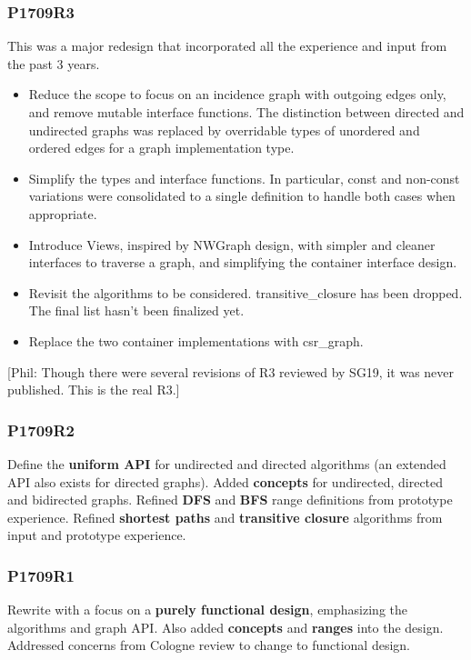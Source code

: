 \documentclass[10pt,onecolumn]{article}
\newcommand{\comment}[2]{{\color{comment}[{\sc #1:} \textsf{#2}]}}
\newcommand{\phil}[1]{\comment{Phil}{#1}}
\begin{document}
\subsubsection*{P1709R3}
This was a major redesign that incorporated all the experience and input from the past 3 years.
\begin{itemize}
\item Reduce the scope to focus on an incidence graph with outgoing edges only, and remove mutable interface functions. The distinction between directed and undirected graphs was replaced by overridable types of unordered and ordered edges for a graph implementation type.
\item Simplify the types and interface functions. In particular, const and non-const variations were consolidated to a single definition to handle both cases 
when appropriate.
\item Introduce Views, inspired by NWGraph design, with simpler and cleaner interfaces to traverse a graph, and simplifying the container interface design.
\item Revisit the algorithms to be considered. transitive\_closure has been dropped. The final list hasn't been finalized yet.
\item Replace the two container implementations with csr\_graph.
\end{itemize}

\phil{Though there were several revisions of R3 reviewed by SG19, it was never published. This is the real R3.}

\subsubsection*{P1709R2}
Define the \textbf{uniform API} for undirected and directed algorithms (an extended API also exists for directed graphs). Added \textbf{concepts} for undirected, directed and bidirected graphs. Refined \textbf{DFS} and \textbf{BFS} range definitions from prototype experience. Refined \textbf{shortest paths} and \textbf{transitive closure} algorithms from input and prototype experience.

\subsubsection*{P1709R1}
Rewrite with a focus on a \textbf{purely functional design}, emphasizing the algorithms and graph API. Also added \textbf{concepts} and \textbf{ranges} into the design. Addressed concerns from Cologne review to change to functional design.
\end{document}
